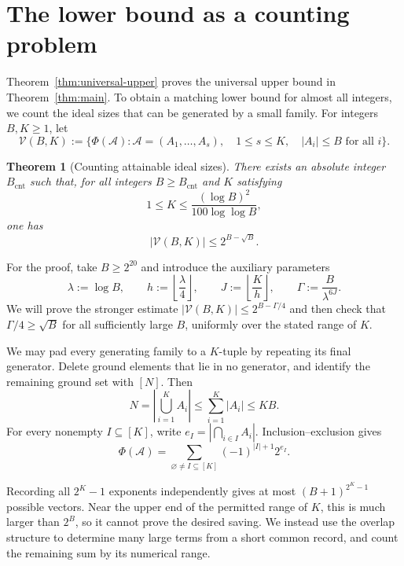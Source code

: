 \documentclass[11pt]{article}
\newtheorem{theorem}{Theorem}[section]
\theoremstyle{definition}
\theoremstyle{remark}
\newcommand{\V}{\mathcal V}
\begin{document}
\section{The lower bound as a counting problem}\label{sec:lower-counting}

Theorem~\ref{thm:universal-upper} proves the universal upper bound in
Theorem~\ref{thm:main}. To obtain a matching lower bound for almost all
integers, we count the ideal sizes that can be generated by a small family.
For integers $B,K\ge1$, let
\[
  \V(B,K):=\{\Phi(\mathcal A):
       \mathcal A=(A_1,\ldots,A_s),\quad
       1\le s\le K,\quad |A_i|\le B\text{ for all }i\}.
\]
\begin{theorem}[Counting attainable ideal sizes]\label{thm:attainable-count}
There exists an absolute integer $B_{\mathrm{cnt}}$ such that, for all integers
$B\ge B_{\mathrm{cnt}}$ and $K$ satisfying
\[
  1\le K\le\frac{(\log B)^2}{100\log\log B},
\]
one has
\[
  |\V(B,K)|\le2^{B-\sqrt B}.
\]
\end{theorem}

For the proof, take $B\ge2^{20}$ and introduce the auxiliary parameters
\begin{equation}
  \lambda:=\log B,\qquad
  h:=\left\lfloor\frac{\lambda}{4}\right\rfloor,\qquad
  J:=\left\lfloor\frac Kh\right\rfloor,\qquad
  \Gamma:=\frac{B}{\lambda^{6J}}.
  \label{eq:main-parameters}
\end{equation}
We will prove the stronger estimate $|\V(B,K)|\le2^{B-\Gamma/4}$ and
then check that $\Gamma/4\ge\sqrt B$ for all sufficiently large $B$,
uniformly over the stated range of $K$.

We may pad every generating family to a $K$-tuple by repeating its final
generator. Delete ground elements that lie in no generator, and identify the
remaining ground set with $[N]$. Then
\begin{equation}
  N=\left|\bigcup_{i=1}^K A_i\right|
    \le\sum_{i=1}^K|A_i|\le KB.
  \label{eq:ground-bound}
\end{equation}
For every nonempty $I\subseteq[K]$, write
$e_I=|\bigcap_{i\in I}A_i|$. Inclusion--exclusion gives
\begin{equation}
  \Phi(\mathcal A)
  =\sum_{\varnothing\ne I\subseteq[K]}(-1)^{|I|+1}2^{e_I}.
  \label{eq:IE}
\end{equation}

Recording all $2^K-1$ exponents independently gives at most
$(B+1)^{2^K-1}$ possible vectors. Near the upper end of the permitted range
of $K$, this is much larger than $2^B$, so it cannot prove the desired
saving. We instead use the overlap structure to determine many large terms
from a short common record, and count the remaining sum by its numerical
range.
\end{document}
